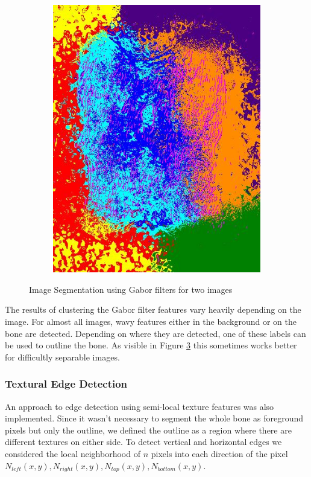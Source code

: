 \documentclass[pdftex,12pt,a4paper]{report}
\begin{document}
\begin{figure}[h]
\begin{subfigure}[b]{0.24\textwidth}
		\subcaption{}
		\label{fig:gabor:bad}
	\end{subfigure}
	\begin{subfigure}[b]{0.24\textwidth}
		\centering
		\includegraphics[width=.9\linewidth]{img/segmentation/bad/gabor/segmented.jpg}
		\subcaption*{}
		\label{}
	\end{subfigure}
	\caption{Image Segmentation using Gabor filters for two images}
	\label{fig:gabor}
\end{figure}

The results of clustering the Gabor filter features vary heavily depending on the image. For almost all images, wavy features either in the background or on the bone are detected. Depending on where they are detected, one of these labels can be used to outline the bone. As visible in Figure \ref{fig:gabor} this sometimes works better for difficultly separable images.

\subsubsection{Textural Edge Detection}

An approach to edge detection using semi-local texture features was also implemented. Since it wasn't necessary to segment the whole bone as foreground pixels but only the outline, we defined the outline as a region where there are different textures on either side. To detect vertical and horizontal edges we considered the local neighborhood of $n$ pixels into each direction of the pixel $N_{left}(x,y), N_{right}(x,y), N_{top}(x,y), N_{bottom}(x,y)$.
\end{document}
